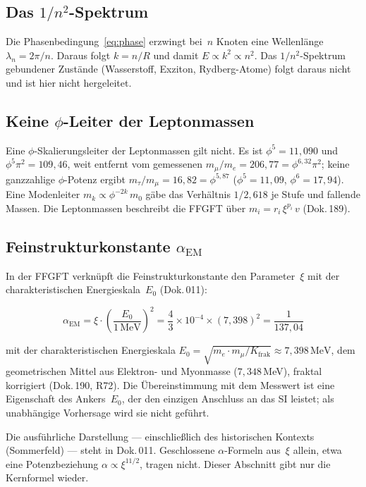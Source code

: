 \subsection{Das $1/n^2$-Spektrum}
\label{sec:188_spektrum}

Die Phasenbedingung~\eqref{eq:phase} erzwingt bei~$n$ Knoten eine
Wellenlänge $\lambda_n = 2\pi/n$. Daraus folgt $k = n/R$ und damit
$E \propto k^2 \propto n^2$. Das $1/n^2$-Spektrum gebundener Zustände
(Wasserstoff, Exziton, Rydberg-Atome) folgt daraus nicht und ist hier
nicht hergeleitet.

\subsection{Keine $\phi$-Leiter der Leptonmassen}

Eine $\phi$-Skalierungsleiter der Leptonmassen gilt nicht. Es ist
$\phi^5 = 11{,}090$ und $\phi^5\pi^2 = 109{,}46$, weit entfernt vom
gemessenen $m_\mu/m_e = 206{,}77 = \phi^{6{,}32}\pi^2$; keine ganzzahlige
$\phi$-Potenz ergibt $m_\tau/m_\mu = 16{,}82 = \phi^{5{,}87}$
($\phi^5 = 11{,}09$, $\phi^6 = 17{,}94$). Eine Modenleiter
$m_k \propto \phi^{-2k}\,m_0$ gäbe das Verhältnis $1/2{,}618$ je Stufe und
fallende Massen. Die Leptonmassen beschreibt die FFGFT über
$m_i = r_i\,\xi^{p_i}\,v$ (Dok.\,189).

\subsection{Feinstrukturkonstante $\alpha_\text{EM}$}

In der FFGFT verknüpft die Feinstrukturkonstante den Parameter~$\xi$
mit der charakteristischen Energieskala~$E_0$ (Dok.\,011):

\begin{equation}
  \alpha_\text{EM} = \xi \cdot \left(\frac{E_0}{1\,\text{MeV}}\right)^2
  = \frac{4}{3} \times 10^{-4} \times (7{,}398)^2
  = \frac{1}{137{,}04}
\end{equation}

\noindent mit der charakteristischen Energieskala
$E_0 = \sqrt{m_e \cdot m_\mu/K_{\text{frak}}} \approx 7{,}398\,\text{MeV}$,
dem geometrischen Mittel aus Elektron- und Myonmasse ($7{,}348$\,MeV), fraktal korrigiert (Dok.\,190, R72). Die Übereinstimmung mit dem Messwert ist eine Eigenschaft des Ankers~$E_0$, der den einzigen Anschluss an das SI leistet; als unabhängige Vorhersage wird sie nicht geführt.

\begin{warnbox}
Die ausführliche Darstellung — einschließlich des historischen Kontexts
(Sommerfeld) — steht in Dok.\,011. Geschlossene $\alpha$-Formeln aus~$\xi$
allein, etwa eine Potenzbeziehung $\alpha \propto \xi^{11/2}$, tragen nicht.
Dieser Abschnitt gibt nur die Kernformel wieder.
\end{warnbox}

